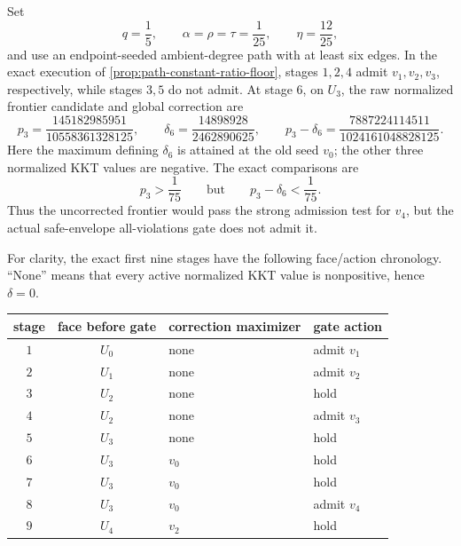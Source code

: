 \begin{proposition}
\label{prop:path-frontier-only-gate-fails}
Set
\begin{equation*}
 q=\frac15,
 \qquad \alpha=\rho=\tau=\frac1{25},
 \qquad \eta=\frac{12}{25},
\end{equation*}
and use an endpoint-seeded ambient-degree path with at least six edges.  In
the exact execution of \cref{prop:path-constant-ratio-floor}, stages $1,2,4$
admit $v_1,v_2,v_3$, respectively, while stages $3,5$ do not admit.  At stage
$6$, on $U_3$, the raw normalized frontier candidate and global correction
are
\begin{equation}
 p_3=\frac{145182985951}{10558361328125},
 \qquad
 \delta_6=\frac{14898928}{2462890625},
 \qquad
 p_3-\delta_6
 =\frac{7887224114511}{1024161048828125}.
 \label{eq:path-stage-six-correction}
\end{equation}
Here the maximum defining $\delta_6$ is attained at the old seed $v_0$;
the other three normalized KKT values are negative.  The exact comparisons
are
\begin{equation}
 p_3>\frac1{75}
 \qquad\text{but}\qquad
 p_3-\delta_6<\frac1{75}.
 \label{eq:path-stage-six-suppression}
\end{equation}
Thus the uncorrected frontier would pass the strong admission test for
$v_4$, but the actual safe-envelope all-violations gate does not admit it.

For clarity, the exact first nine stages have the following face/action
chronology.  ``None'' means that every active normalized KKT value is
nonpositive, hence $\delta=0$.
\begin{center}
\begin{tabular}{@{}ccll@{}}
\toprule
stage & face before gate & correction maximizer & gate action \\
\midrule
$1$ & $U_0$ & none & admit $v_1$ \\
$2$ & $U_1$ & none & admit $v_2$ \\
$3$ & $U_2$ & none & hold \\
$4$ & $U_2$ & none & admit $v_3$ \\
$5$ & $U_3$ & none & hold \\
$6$ & $U_3$ & $v_0$ & hold \\
$7$ & $U_3$ & $v_0$ & hold \\
$8$ & $U_3$ & $v_0$ & admit $v_4$ \\
$9$ & $U_4$ & $v_2$ & hold \\
\bottomrule
\end{tabular}
\end{center}


\end{proposition}
